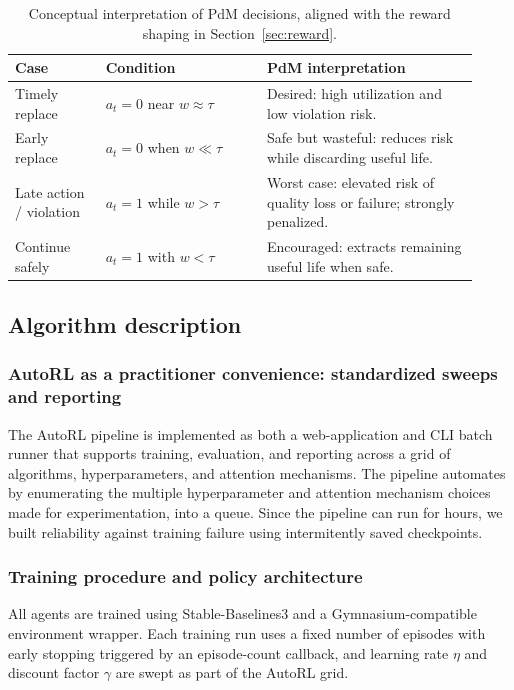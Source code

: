 \documentclass[sn-basic]{sn-jnl} %
\begin{document}
\begin{table}[t]
	\centering
	\caption{Conceptual interpretation of PdM decisions, aligned with the reward shaping in Section~\ref{sec:reward}.}
	\label{tab:cost_view}
	\begin{tabular}{p{0.18\linewidth} p{0.32\linewidth} p{0.42\linewidth}}
		\toprule
		\textbf{Case} & \textbf{Condition} & \textbf{PdM interpretation}\\
		\midrule
		Timely replace & $a_t=0$ near $w\approx\tau$ & Desired: high utilization and low violation risk.\\
		Early replace & $a_t=0$ when $w\ll\tau$ & Safe but wasteful: reduces risk while discarding useful life.\\
		Late action / violation & $a_t=1$ while $w>\tau$ & Worst case: elevated risk of quality loss or failure; strongly penalized.\\
		Continue safely & $a_t=1$ with $w<\tau$ & Encouraged: extracts remaining useful life when safe.\\
		\bottomrule
	\end{tabular}
\end{table}

\subsection{Algorithm description}\label{sec:algo_desc}
\subsubsection{AutoRL as a practitioner convenience: standardized sweeps and reporting}\label{sec:autorl}
The AutoRL pipeline is implemented as both a web-application and CLI batch runner that supports training, evaluation, and reporting across a grid of algorithms, hyperparameters, and attention mechanisms. The pipeline automates by enumerating the multiple hyperparameter and attention mechanism choices made for experimentation, into a queue. Since the pipeline can run for hours, we built reliability against training failure using intermitently saved checkpoints.

\subsubsection{Training procedure and policy architecture}
All agents are trained using Stable-Baselines3 and a Gymnasium-compatible environment wrapper. Each training run uses a fixed number of episodes with early stopping triggered by an episode-count callback, and learning rate $\eta$ and discount factor $\gamma$ are swept as part of the AutoRL grid.
\end{document}
